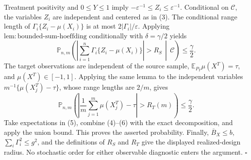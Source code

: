 Treatment positivity and \(0\le Y\le1\) imply \(-\varepsilon^{-1}\le Z_i\le\varepsilon^{-1}\). Conditional on \(\mathcal C\), the variables \(Z_i\) are independent and centered as in (3). The conditional range length of \(\Gamma_i\{Z_i-\mu(X_i)\}\) is at most \(2|\Gamma_i|/\varepsilon\). Applying \(\mathrm{lem:bounded\text{-}sum\text{-}hoeffding}\) conditionally with \(\delta=\gamma/2\) yields
\[
\mathbb P_{n,m}\!\left(
\left|\sum_{i=1}^n\Gamma_i\{Z_i-\mu(X_i)\}\right|>R_S
\,\middle|\,\mathcal C\right)\le\frac\gamma2.
\tag{5}
\]
The target observations are independent of the source sample, \(\mathbb E_{P_T}\mu(X^T)=\tau\), and \(\mu(X^T)\in[-1,1]\). Applying the same lemma to the independent variables \(m^{-1}\{\mu(X_j^T)-\tau\}\), whose range lengths are \(2/m\), gives
\[
\mathbb P_{n,m}\!\left(
\left|\frac1m\sum_{j=1}^m\mu(X_j^T)-\tau\right|>R_T(m)
\right)\le\frac\gamma2.
\tag{6}
\]
Take expectations in (5), combine (4)--(6) with the exact decomposition, and apply the union bound. This proves the asserted probability. Finally, \(\overline B_X\le b\), \(\sum_i\Gamma_i^2\le g^2\), and the definitions of \(R_S\) and \(R_T\) give the displayed realized-design radius. No stochastic order for either observable diagnostic enters the argument. \(\square\)